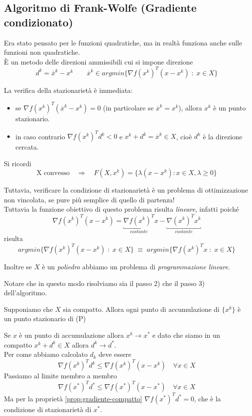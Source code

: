 \subsection{Algoritmo di Frank-Wolfe (Gradiente condizionato)}
Era stato pensato per le funzioni quadratiche, ma in realt\`a funziona
anche sulle funzioni non quadratiche. \\
\`E un metodo delle direzioni ammissibili cui si impone direzione
$$ d^{k} = \overline{x}^{k} - x^{k} \qquad 
\overline{x}^{k} \in argmin \{\nabla f(x^{k})^{T}(x -x^{k}) \; : \; x \in X \}
$$

La verifica della stazionariet\`a \`e immediata:
\begin{itemize}
\item se $\nabla f(x^{k})^{T}(\overline{x}^{k} - x^{k})=0$ (in
  particolare se $\overline{x}^{k}=x^{k}$), allora $x^{k}$ \`e
  un punto stazionario. 
\item in caso contrario
  $\nabla f(x^{k})^{T}d^{k} < 0$ e $x^{k} + d^{k} = \overline{x}^{k} \in X$, 
  cio\`e $d^{k}$ \`e la direzione cercata.
\end{itemize}
\begin{notes}
Si ricordi
$$ \text{X convesso} \quad \Rightarrow \quad 
F(X, x^{k}) = \{ \lambda (x - x^{k}) : x \in X, \lambda \geq 0 \} $$
\end{notes}

Tuttavia, verificare la condizione di stazionarietà \`e un problema di ottimizzazione non vincolata, se pure più semplice di quello di partenza!\\ 
Tuttavia la funzione obiettivo di questo problema risulta \emph{lineare},
infatti poiché 
$$ \nabla f(x^{k})^{T} (x-x^k) = \underbracket{\nabla f(x^{k})^{T}}_{costante} x -
\underbracket{\nabla (x^{k})^{T}x^k}_{costante} $$ 
risulta
$$ argmin \{\nabla f(x^{k})^{T}(x -x^{k}) \; : \; x \in X \} \;\equiv\;
   argmin \{\nabla f(x^{k})^{T}x \; : \; x \in X \} $$

Inoltre se $X$ \`e un \emph{poliedro} abbiamo un problema di 
\emph{programmazione lineare}.

Notare che in questo modo risolviamo sia il passo 2) che il passo 3) dell'algoritmo.


\begin{theo}[Convergenza]
  Supponiamo che $X$ sia compatto. Allora ogni punto
  di accumulazione di $\{x^{k}\}$ \`e un punto stazionario di (P)
\end{theo}
\begin{thproof}
  Se $x$ è un punto di accumulazione allora $x^k \rightarrow x^{*}$ e
  dato che siamo in un compatto $x^k + d^k \in X$ allora $d^k
  \rightarrow d^{*}$.\\
  Per come abbiamo calcolato $d_k$ deve essere
  $$ \nabla f(x^{k})^{T} d^k \leq \nabla f(x^{k})^{T} (x -x^{k})
  \quad \forall x \in X$$
  Passiamo al limite membro a membro
  $$ \nabla f(x^{*})^{T} d^{*}
  \leq \nabla f(x^{*})^{T}(x-x^{*}) \quad \forall x \in X$$
  Ma per la propriet\`a \ref{prop:gradiente-compatto} $\nabla
  f(x^{*})^{T} d^{*} = 0$, che è la condizione di stazionariet\`a di $x^{*}$.
\end{thproof}

